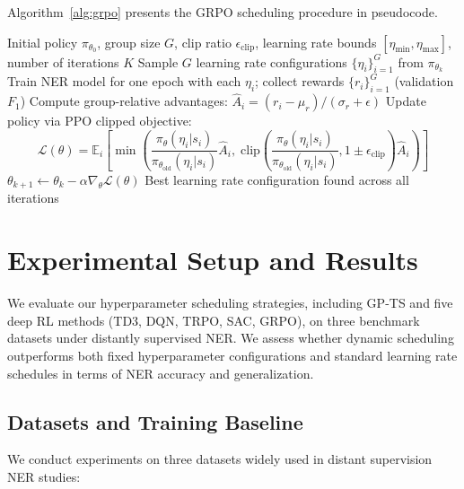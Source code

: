 \documentclass[11pt]{article}
\begin{document}
Algorithm~\ref{alg:grpo} presents the GRPO scheduling procedure in pseudocode.

\begin{algorithm}[t]
\small
\caption{GRPO Hyperparameter Scheduling}
\label{alg:grpo}
\begin{algorithmic}[1]
\REQUIRE Initial policy $\pi_{\theta_0}$, group size $G$, clip ratio $\epsilon_{\text{clip}}$, learning rate bounds $[\eta_{\min}, \eta_{\max}]$, number of iterations $K$
    \STATE Sample $G$ learning rate configurations $\{\eta_i\}_{i=1}^{G}$ from $\pi_{\theta_k}$
    \STATE Train NER model for one epoch with each $\eta_i$; collect rewards $\{r_i\}_{i=1}^{G}$ (validation $F_1$)
    \STATE Compute group-relative advantages: $\hat{A}_i = (r_i - \mu_r) / (\sigma_r + \epsilon)$
    \STATE Update policy via PPO clipped objective:
    \[
    \mathcal{L}(\theta) = \mathbb{E}_i \left[ \min\left( \frac{\pi_\theta(\eta_i | s_i)}{\pi_{\theta_{\text{old}}}(\eta_i | s_i)} \hat{A}_i,\; \text{clip}\left(\frac{\pi_\theta(\eta_i | s_i)}{\pi_{\theta_{\text{old}}}(\eta_i | s_i)}, 1 \pm \epsilon_{\text{clip}}\right) \hat{A}_i \right) \right]
    \]
    \STATE $\theta_{k+1} \leftarrow \theta_k - \alpha \nabla_\theta \mathcal{L}(\theta)$
\ENDFOR
\RETURN Best learning rate configuration found across all iterations
\end{algorithmic}
\end{algorithm}

\section{Experimental Setup and Results}

We evaluate our hyperparameter scheduling strategies, including GP-TS and five deep RL methods (TD3, DQN, TRPO, SAC, GRPO), on three benchmark datasets under distantly supervised NER. We assess whether dynamic scheduling outperforms both fixed hyperparameter configurations and standard learning rate schedules in terms of NER accuracy and generalization.

\subsection{Datasets and Training Baseline}

We conduct experiments on three datasets widely used in distant supervision NER studies:
\end{document}
